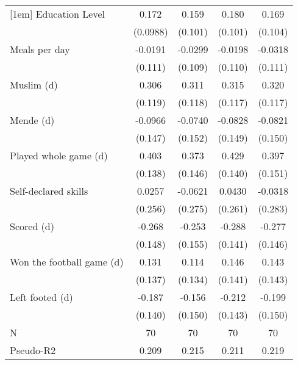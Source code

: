 {\begin{tabular}{l*{4}{c}}
[1em]
Education Level     &       0.172\sym{*}  &       0.159         &       0.180\sym{*}  &       0.169         \\
                    &    (0.0988)         &     (0.101)         &     (0.101)         &     (0.104)         \\
[1em]
Meals per day       &     -0.0191         &     -0.0299         &     -0.0198         &     -0.0318         \\
                    &     (0.111)         &     (0.109)         &     (0.110)         &     (0.111)         \\
[1em]
Muslim (d)          &       0.306\sym{**} &       0.311\sym{***}&       0.315\sym{***}&       0.320\sym{***}\\
                    &     (0.119)         &     (0.118)         &     (0.117)         &     (0.117)         \\
[1em]
Mende (d)           &     -0.0966         &     -0.0740         &     -0.0828         &     -0.0821         \\
                    &     (0.147)         &     (0.152)         &     (0.149)         &     (0.150)         \\
[1em]
Played whole game (d)&       0.403\sym{***}&       0.373\sym{**} &       0.429\sym{***}&       0.397\sym{***}\\
                    &     (0.138)         &     (0.146)         &     (0.140)         &     (0.151)         \\
[1em]
Self-declared skills&      0.0257         &     -0.0621         &      0.0430         &     -0.0318         \\
                    &     (0.256)         &     (0.275)         &     (0.261)         &     (0.283)         \\
[1em]
Scored (d)          &      -0.268\sym{*}  &      -0.253         &      -0.288\sym{**} &      -0.277\sym{*}  \\
                    &     (0.148)         &     (0.155)         &     (0.141)         &     (0.146)         \\
[1em]
Won the football game (d)&       0.131         &       0.114         &       0.146         &       0.143         \\
                    &     (0.137)         &     (0.134)         &     (0.141)         &     (0.143)         \\
[1em]
Left footed (d)     &      -0.187         &      -0.156         &      -0.212         &      -0.199         \\
                    &     (0.140)         &     (0.150)         &     (0.143)         &     (0.150)         \\
\hline
N                   &          70         &          70         &          70         &          70         \\
Pseudo-R2                  &       0.209         &       0.215         &       0.211         &       0.219         \\
\hline\hline
\end{tabular}
}
